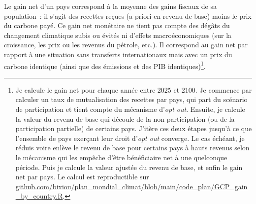 \documentclass[a5paper,french,openany]{memoir}
\begin{document}
Le gain net d'un pays correspond à la moyenne des gains fiscaux de sa population~: il s'agit des recettes reçues (a priori en revenu de base) moins le prix du carbone payé. Ce gain net monétaire ne tient pas compte des dégâts du changement climatique subis ou évités ni d'effets macroéconomiques (sur la croissance, les prix ou les revenus du pétrole, etc.). Il correspond au gain net par rapport à une situation sans transferts internationaux mais avec un prix du carbone identique (ainsi que des émissions et des PIB identiques)\footnote{Je calcule le gain net pour chaque année entre 2025 et 2100. 
Je commence par calculer un taux de mutualisation des recettes par pays, qui part du scénario de participation et tient compte du mécanisme d'\textit{opt out}. Ensuite, je calcule la valeur du revenu de base qui découle de la non-participation (ou de la participation partielle) de certains pays. J'itère ces deux étapes jusqu'à ce que l'ensemble de pays exerçant leur droit d'\textit{opt out} converge. 
Le cas échéant, je réduis voire enlève le revenu de base pour certains pays à hauts revenus selon le mécanisme qui les empêche d'être bénéficiaire net à une quelconque période. Puis je calcule la valeur ajustée du revenu de base, et enfin le gain net par pays. Le calcul est reproductible sur \href{https://github.com/bixiou/plan_mondial_climat/blob/main/code_plan/GCP_gain_by_country.R}{github.com/bixiou/plan\_mondial\_climat/blob/main/code\_plan/GCP\_gain\_by\_country.R}.}. 
\end{document}
